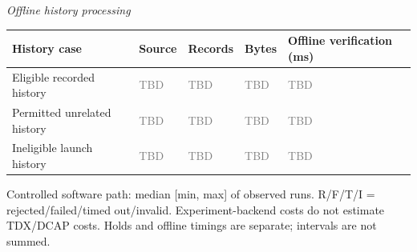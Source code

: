 \documentclass[10pt]{article}
\begin{document}
\begin{table}[t]
\begin{tabularx}{\linewidth}{@{}Y Y Y@{}}
\bottomrule
\end{tabularx}
\par\medskip\textit{Offline history processing}\par\smallskip
\begin{tabularx}{\linewidth}{@{}Y Y Y Y Y@{}}
\toprule
\textbf{History case} & \textbf{Source} & \textbf{Records} & \textbf{Bytes} & \textbf{Offline verification (ms)} \\
\midrule
Eligible recorded history & \textcolor{gray}{TBD} & \textcolor{gray}{TBD} & \textcolor{gray}{TBD} & \textcolor{gray}{TBD} \\
Permitted unrelated history & \textcolor{gray}{TBD} & \textcolor{gray}{TBD} & \textcolor{gray}{TBD} & \textcolor{gray}{TBD} \\
Ineligible launch history & \textcolor{gray}{TBD} & \textcolor{gray}{TBD} & \textcolor{gray}{TBD} & \textcolor{gray}{TBD} \\
\bottomrule
\end{tabularx}
\par\smallskip\footnotesize Controlled software path: median [min, max] of observed runs. R/F/T/I = rejected/failed/timed out/invalid. Experiment-backend costs do not estimate TDX/DCAP costs. Holds and offline timings are separate; intervals are not summed.
\end{table}
\end{document}
